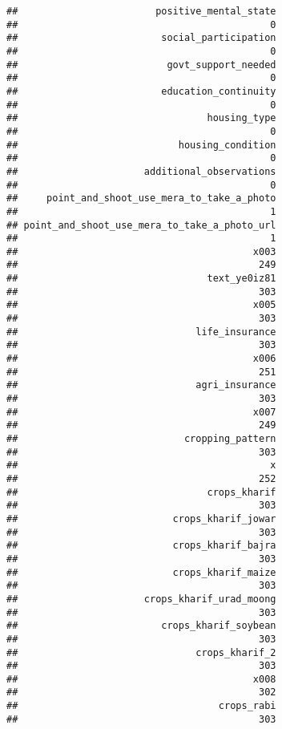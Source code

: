 \documentclass[
]{article}
\begin{document}
\begin{verbatim}
##                        positive_mental_state 
##                                            0 
##                         social_participation 
##                                            0 
##                          govt_support_needed 
##                                            0 
##                         education_continuity 
##                                            0 
##                                 housing_type 
##                                            0 
##                            housing_condition 
##                                            0 
##                      additional_observations 
##                                            0 
##     point_and_shoot_use_mera_to_take_a_photo 
##                                            1 
## point_and_shoot_use_mera_to_take_a_photo_url 
##                                            1 
##                                         x003 
##                                          249 
##                                 text_ye0iz81 
##                                          303 
##                                         x005 
##                                          303 
##                               life_insurance 
##                                          303 
##                                         x006 
##                                          251 
##                               agri_insurance 
##                                          303 
##                                         x007 
##                                          249 
##                             cropping_pattern 
##                                          303 
##                                            x 
##                                          252 
##                                 crops_kharif 
##                                          303 
##                           crops_kharif_jowar 
##                                          303 
##                           crops_kharif_bajra 
##                                          303 
##                           crops_kharif_maize 
##                                          303 
##                      crops_kharif_urad_moong 
##                                          303 
##                         crops_kharif_soybean 
##                                          303 
##                               crops_kharif_2 
##                                          303 
##                                         x008 
##                                          302 
##                                   crops_rabi 
##                                          303 

\end{verbatim}
\end{document}
